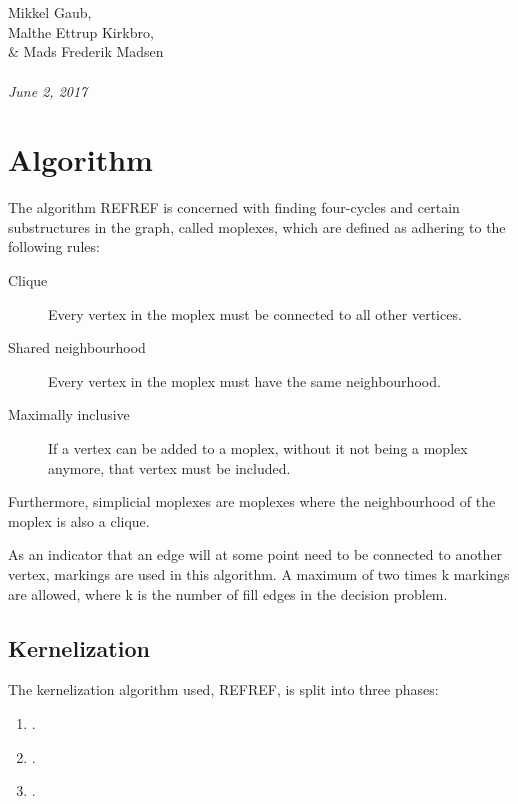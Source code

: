 \documentclass{article}
\begin{document}
\begin{titlepage}
		 \\ \\
		Mikkel Gaub, \\ Malthe Ettrup Kirkbro, \\ \& Mads Frederik Madsen	\\ \\
		\hspace{-18pt}
		\textit{June 2, 2017}
		\thispagestyle{empty}
	\end{titlepage}
	\clearpage

	\section{Algorithm}
	The algorithm REFREF is concerned with finding four-cycles and certain substructures in the graph, called moplexes, which are defined as adhering to the following rules: \\

	\begin{description}
		\item[Clique] Every vertex in the moplex must be connected to all other vertices.
		\item[Shared neighbourhood] Every vertex in the moplex must have the same neighbourhood.
		\item[Maximally inclusive] If a vertex can be added to a moplex, without it not being a moplex anymore, that vertex must be included.
	\end{description}

	Furthermore, simplicial moplexes are moplexes where the neighbourhood of the moplex is also a clique.

	As an indicator that an edge will at some point need to be connected to another vertex, markings are used in this algorithm. 
	A maximum of two times k markings are allowed, where k is the number of fill edges in the decision problem.

		\subsection{Kernelization}
		The kernelization algorithm used, REFREF, is split into three phases:

		\begin{enumerate}
			\item .
			\item .
			\item .
		\end{enumerate}
\end{document}
